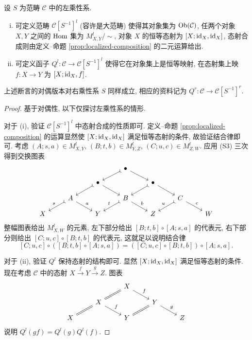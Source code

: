 \begin{definition-theorem}\label{def:fraction-localization}
	设 $S$ 为范畴 $\mathcal{C}$ 中的左乘性系.
	\begin{enumerate}[(i)]
		\item 可定义范畴 $\mathcal{C}[S^{-1}]^l$ (容许是大范畴) 使得其对象集为 $\operatorname{Ob}(\mathcal{C})$, 任两个对象 $X, Y$ 之间的 $\operatorname{Hom}$ 集为 $M_{X, Y}^l /\sim$, 对象 $X$ 的恒等态射为 $[X; \mathrm{id}_X, \mathrm{id}_X]$, 态射合成则由定义--命题 \ref{prop:localized-composition} 的二元运算给出.
		\item 可定义函子 $Q^l: \mathcal{C} \to \mathcal{C}[S^{-1}]^l$ 使得它在对象集上是恒等映射, 在态射集上映 $f: X \to Y$ 为 $[X; \mathrm{id}_X, f]$.
	\end{enumerate}
	上述断言的对偶版本对右乘性系 $S$ 同样成立, 相应的资料记为 $Q^r: \mathcal{C} \to \mathcal{C}[S^{-1}]^r$.
\end{definition-theorem}
\begin{proof}
	基于对偶性, 以下仅探讨左乘性系的情形.
	
	对于 (i), 验证 $\mathcal{C}[S^{-1}]^l$ 中态射合成的性质即可. 定义--命题 \ref{prop:localized-composition} 的运算显然使 $[X; \mathrm{id}_X, \mathrm{id}_X]$ 满足恒等态射的条件, 故验证结合律即可. 考虑 $(A; s, a) \in M_{X, Y}^l$, $(B; t, b) \in M_{Y, Z}^l$, $(C; u, c) \in M_{Z, W}^l$. 应用 (S3) 三次得到交换图表
	\[\begin{tikzcd}[row sep=small]
		& & & \bullet \arrow[rightarrowtail, ld] \arrow[rd] & & & \\
		& & \bullet \arrow[rightarrowtail, ld] \arrow[rd] & & \bullet \arrow[rightarrowtail, ld] \arrow[rd] & & \\
		& A \arrow[rightarrowtail, ld, "s"'] \arrow[rd, "a"] & & B \arrow[rightarrowtail, ld, "t"'] \arrow[rd, "b"] & & C \arrow[rightarrowtail, ld, "u"'] \arrow[rd, "c"] & \\
		X & & Y & & Z & & W
	\end{tikzcd}\]
	整幅图表给出 $M_{X, W}^l$ 的元素, 左下部分给出 $[B; t, b] \circ [A; s, a]$ 的代表元, 右下部分则给出 $[C; u, c] \circ [B; t, b]$ 的代表元, 这就足以说明结合律
	\[ [C; u, c] \circ ([B; t, b] \circ [A; s, a]) = ([C; u, c] \circ [B; t, b]) \circ [A; s, a]. \]
	
	对于 (ii), 验证 $Q^l$ 保持态射的结构即可. 显然 $[X; \mathrm{id}_X, \mathrm{id}_X]$ 满足恒等态射的条件. 现在考虑 $\mathcal{C}$ 中的态射 $X \xrightarrow{f} Y \xrightarrow{g} Z$. 图表
	\[\begin{tikzcd}[row sep=small]
		& & X \arrow[equal, ld] \arrow[rd, "f"] & & \\
		& X \arrow[equal, ld] \arrow[rd, "f"] & & Y \arrow[equal, ld] \arrow[rd, "g"] & \\
		X & & Y & & Z
	\end{tikzcd}\]
	说明 $Q^l(gf) = Q^l(g) Q^l(f)$.
\end{proof}

